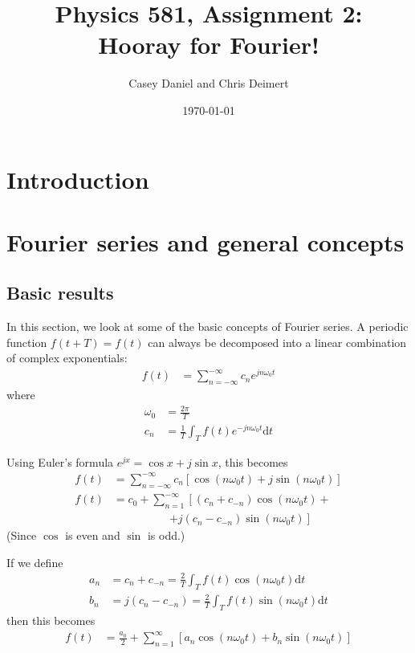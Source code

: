 \documentclass[twocolumn]{myarticle}
\renewcommand{\d}{\mathrm{d}}
\begin{document}
\title{Physics 581, Assignment 2:\\Hooray for Fourier!}
\author{Casey Daniel and Chris Deimert}
\date{\today}

\maketitle

\section{Introduction}
\label{sec:introduction}

\section{Fourier series and general concepts}
\label{sec:fourier_series_and_general_concepts}

\subsection{Basic results}
\label{subsec:basic_results}

In this section, we look at some of the basic concepts of Fourier series.
A periodic function $ f(t+T) = f(t) $ can always be decomposed into a linear combination of complex exponentials:
\begin{align}
    f(t) &= \sum_{n = -\infty}^{-\infty} c_n e^{j n \omega_0 t}
\end{align}
where
\begin{align}
    \omega_0 &= \frac{2 \pi}{T}
    \\
    c_n &= \frac{1}{T} \int_{T} f(t) e^{-j n \omega_0 t} \d t
\end{align}

Using Euler's formula $ e^{jx} = \cos x + j \sin x $, this becomes
\begin{align}
    f(t) &= \sum_{n = -\infty}^{-\infty} c_n \left[ \cos (n \omega_0 t) + j \sin (n \omega_0 t) \right]
    \\
    f(t) &= c_0 + \sum_{n = 1}^{-\infty} \left[ (c_n + c_{-n}) \cos (n \omega_0 t) + \right.
    \nonumber \\
    &\qquad \qquad \quad \left. + j (c_n - c_{-n}) \sin (n \omega_0 t) \right]
\end{align}
(Since $ \cos $ is even and $ \sin $ is odd.)

If we define
\begin{align}
    a_n &= c_n + c_{-n} = \frac{2}{T} \int_{T} f(t) \cos(n \omega_0 t) \d t \label{eq:a_n_def}
    \\
    b_n &= j(c_n - c_{-n}) = \frac{2}{T} \int_{T} f(t) \sin(n \omega_0 t) \d t \label{eq:b_n_def}
\end{align}
then this becomes
\begin{align}
    f(t) &= \frac{a_0}{2} + \sum_{n = 1}^{\infty} \left[ a_n \cos (n \omega_0 t) + b_n \sin (n \omega_0 t) \right]
\end{align}
\end{document}
